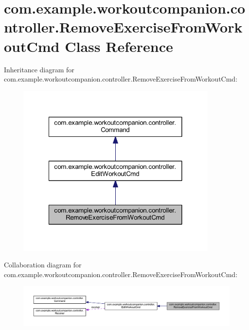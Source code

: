 \hypertarget{classcom_1_1example_1_1workoutcompanion_1_1controller_1_1_remove_exercise_from_workout_cmd}{\section{com.\-example.\-workoutcompanion.\-controller.\-Remove\-Exercise\-From\-Workout\-Cmd Class Reference}
\label{classcom_1_1example_1_1workoutcompanion_1_1controller_1_1_remove_exercise_from_workout_cmd}
}


Inheritance diagram for com.\-example.\-workoutcompanion.\-controller.\-Remove\-Exercise\-From\-Workout\-Cmd\-:\nopagebreak
\begin{figure}[H]
\begin{center}
\leavevmode
\includegraphics[width=284pt]{classcom_1_1example_1_1workoutcompanion_1_1controller_1_1_remove_exercise_from_workout_cmd__inherit__graph}
\end{center}
\end{figure}


Collaboration diagram for com.\-example.\-workoutcompanion.\-controller.\-Remove\-Exercise\-From\-Workout\-Cmd\-:\nopagebreak
\begin{figure}[H]
\begin{center}
\leavevmode
\includegraphics[width=350pt]{classcom_1_1example_1_1workoutcompanion_1_1controller_1_1_remove_exercise_from_workout_cmd__coll__graph}
\end{center}
\end{figure}
